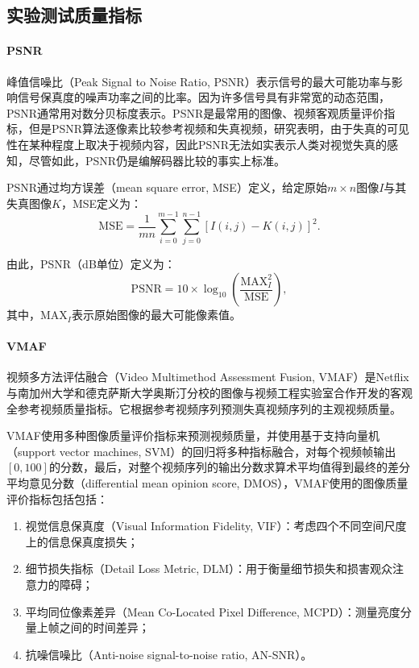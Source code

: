 	\subsection{实验测试质量指标}

	\paragraph{PSNR}
	峰值信噪比（Peak Signal to Noise Ratio, PSNR）表示信号的最大可能功率与影响信号保真度的噪声功率之间的比率。因为许多信号具有非常宽的动态范围，PSNR通常用对数分贝标度表示。PSNR是最常用的图像、视频客观质量评价指标，但是PSNR算法逐像素比较参考视频和失真视频，研究\cite{huynh-thuAccuracyPSNRPredicting2012}表明，由于失真的可见性在某种程度上取决于视频内容，因此PSNR无法如实表示人类对视觉失真的感知，尽管如此，PSNR仍是编解码器比较的事实上标准。

	PSNR通过均方误差（mean square error, MSE）定义，给定原始$m\times n$图像$I$与其失真图像$K$，MSE定义为：
	\begin{equation}
		\mathrm{MSE} = \frac{1}{mn} \sum_{i=0}^{m-1} \sum_{j=0}^{n-1}[I(i, j) - K(i, j)]^2.
	\end{equation}

	由此，PSNR（dB单位）定义为：
	\begin{equation}
	\mathrm{PSNR} = 10 \times \log_{10} \left(\frac{\mathrm{MAX}_I^2}{\mathrm{MSE}}\right),
	\end{equation}
	其中，$\mathrm{MAX}_I$表示原始图像的最大可能像素值。
	\paragraph{VMAF}
	视频多方法评估融合（Video Multimethod Assessment Fusion, VMAF\cite{liPracticalPerceptualVideo}）是Netflix与南加州大学和德克萨斯大学奥斯汀分校的图像与视频工程实验室合作开发的客观全参考视频质量指标。它根据参考视频序列预测失真视频序列的主观视频质量。

	VMAF使用多种图像质量评价指标来预测视频质量，并使用基于支持向量机（support vector machines, SVM）的回归将多种指标融合，对每个视频帧输出$[0,100]$的分数，最后，对整个视频序列的输出分数求算术平均值得到最终的差分平均意见分数（differential mean opinion score, DMOS），VMAF使用的图像质量评价指标包括包括：
	\begin{enumerate}[label=\arabic*)]
		\item 视觉信息保真度（Visual Information Fidelity, VIF）：考虑四个不同空间尺度上的信息保真度损失；
		\item 细节损失指标（Detail Loss Metric, DLM）：用于衡量细节损失和损害观众注意力的障碍；
		\item 平均同位像素差异（Mean Co-Located Pixel Difference, MCPD）：测量亮度分量上帧之间的时间差异；
		\item 抗噪信噪比（Anti-noise signal-to-noise ratio, AN-SNR）。
	\end{enumerate}

